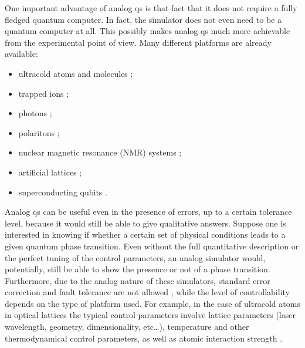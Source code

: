 One important advantage of analog \ac{qs} is that fact that it does not require a fully fledged quantum computer.
In fact, the simulator does not even need to be a quantum computer at all.
This possibly makes analog \ac{qs} much more achievable from the experimental point of view.
Many different platforms are already available:
\begin{itemize}[label=$-$]
    \item ultracold atoms and molecules \cite{lewenstein2012ultracold, bloch2012ultracold, bloch2008ultracold, lin2009ultracold, muller2012ions, aidelsburger2011ultracold};
    \item trapped ions \cite{blatt2012trappedions, muller2012ions, johanning2009ions, schneider2012ions};
    \item photons \cite{aspuruguzik2012photonic, angelakis2017quantum};
    \item polaritons \cite{angelakis2017quantum, hartmann2006polaritons};
    \item nuclear magnetic resonance (NMR) systems \cite{somaroo1999simulation, tseng1999nmr};
    \item artificial lattices \cite{singha2011lattice};
    \item superconducting qubits \cite{houck2012superconducting, makhlin2001superconducting, devoret2004superconducting, you2005superconducting, pritchett2010superconducting}.
\end{itemize}

Analog \ac{qs} can be useful even in the presence of errors, up to a certain tolerance level, because it would still be able to give qualitative answers.
Suppose one is interested in knowing if whether a certain set of physical conditions leads to a given quantum phase transition.
Even without the full quantitative description or the perfect tuning of the control parameters, an analog simulator would, potentially, still be able to show the presence or not of a phase transition.
Furthermore, due to the analog nature of these simulators, standard error correction and fault tolerance are not allowed \cite{hauke2012simulators}, while the level of controllability depends on the type of platform used.
For example, in the case of ultracold atoms in optical lattices the typical control parameters involve lattice parameters (laser wavelength, geometry, dimensionality, etc\dots), temperature and other thermodynamical control parameters, as well as atomic interaction strength \cite{lewenstein2012ultracold}.


%
%
